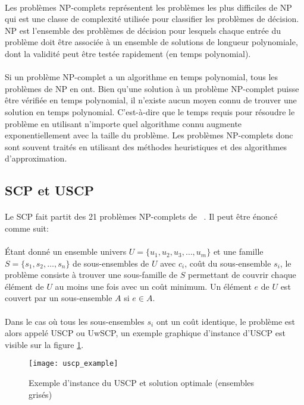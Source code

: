 \documentclass[a4paper,11pt,twoside,french,report]{../common/simplem}
\begin{document}
				\paragraph*{}
					Les problèmes \acrshort{NP}-complets représentent les problèmes les plus difficiles de \acrfull{NP} qui est une classe de complexité utilisée pour classifier les problèmes de décision. \acrshort{NP} est l'ensemble des problèmes de décision pour lesquels chaque entrée du problème doit être associée à un ensemble de solutions de longueur polynomiale, dont la validité peut être testée rapidement (en temps polynomial).
				\paragraph*{}
					Si un problème \acrshort{NP}-complet a un algorithme en temps polynomial, tous les problèmes de \acrshort{NP} en ont. Bien qu'une solution à un problème \acrshort{NP}-complet puisse être vérifiée en temps polynomial, il n'existe aucun moyen connu de trouver une solution en temps polynomial. C'est-à-dire que le temps requis pour résoudre le problème en utilisant n'importe quel algorithme connu augmente exponentiellement avec la taille du problème. Les problèmes \acrshort{NP}-complets donc sont souvent traités en utilisant des méthodes heuristiques et des algorithmes d'approximation.
			\subsection{\acrshort{SCP} et \acrshort{USCP}}\label{sec:SCP_et_USCP}
				\paragraph*{}
					Le \gls{SCP} fait partit des 21 problèmes \acrshort{NP}-complets de \citeauthor{Karp1972}~\cite{Karp1972}. Il peut être énoncé comme suit:
				\paragraph*{}
					Étant donné un ensemble univers \(U = \{u_1, u_2, u_3, \dots, u_m\}\) et une famille \(S = \{s_1, s_2, \dots, s_n\}\) de sous-ensembles de \(U\) avec \(c_i\), coût du sous-ensemble \(s_i\), le problème consiste à trouver une sous-famille de \(S\) permettant de couvrir chaque élément de \(U\) au moins une fois avec un coût minimum. Un élément \(e\) de \(U\) est couvert par un sous-ensemble \(A\) si \(e \in A\).
				\paragraph*{}
					Dans le cas où tous les sous-ensembles \(s_i\) ont un coût identique, le problème est alors appelé \gls{USCP} ou \gls{UwSCP}, un exemple graphique d'instance d'\gls{USCP} est visible sur la figure \ref{fig:uscp_example}.
				\begin{figure}[H]
					\centering%
					\texttt{[image: uscp\_example]}%
					\caption{Exemple d'instance du \acrshort{USCP} et solution optimale (ensembles grisés)~\cite{Mount2017}}%
					\label{fig:uscp_example}%
				\end{figure}
\end{document}
